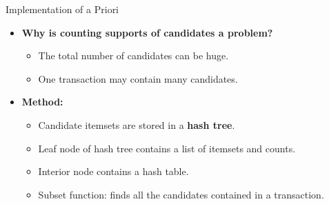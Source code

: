 \begin{frame}{Implementation of a Priori}
	\begin{itemize}
		\item \textbf{Why is counting supports of candidates a problem?}
		\begin{itemize}
			\item The total number of candidates can be huge.
			\item One transaction may contain many candidates.
		\end{itemize}
		\item \textbf{Method:}
		\begin{itemize}
			\item Candidate itemsets are stored in a \textbf{hash tree}.
			\item Leaf node of hash tree contains a list of itemsets and counts.
			\item Interior node contains a hash table.
			\item Subset function: finds all the candidates contained in a 
			transaction.
		\end{itemize}
	\end{itemize}
\end{frame}

